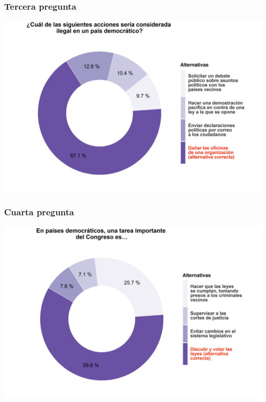 \documentclass[
  14pt,
]{book}
\begin{document}
\hypertarget{tercera-pregunta}{%
\subsubsection{Tercera pregunta}\label{tercera-pregunta}}

\begin{center}\includegraphics[width=52.49in]{images/ccivico_3} \end{center}

\hypertarget{cuarta-pregunta}{%
\subsubsection{Cuarta pregunta}\label{cuarta-pregunta}}

\begin{center}\includegraphics[width=52.49in]{images/ccivico_4} \end{center}
\end{document}
